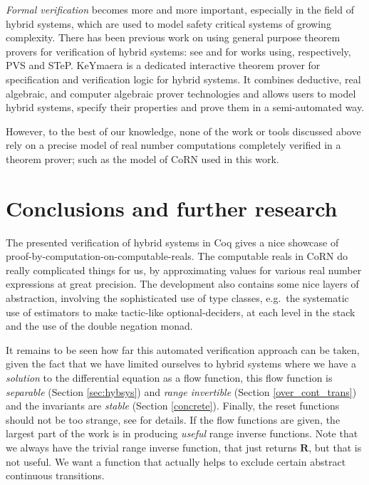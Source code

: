 \documentclass[runningheads]{llncs}
\newcommand{\IR}{{\mathbf R}}
\begin{document}
\emph{Formal verification} becomes more and more important, especially in the
field of hybrid systems, which are used to model safety critical systems 
of growing complexity. There has been previous work on using general purpose 
theorem provers for verification of hybrid systems: see \cite{Mum01,Hen98} 
and \cite{Man98,Man01} for works using, respectively, PVS and STeP. 
KeYmaera \cite{KeYmaera} is a dedicated interactive theorem prover for 
specification and verification logic for hybrid systems. It combines
deductive, real algebraic, and computer algebraic prover technologies
and allows users to model hybrid systems, specify their properties
and prove them in a semi-automated way.

However, to the best of our knowledge, none of the work or tools
discussed above rely on a precise model of real number computations
completely verified in a theorem prover; such as the model of CoRN
used in this work.

\section{Conclusions and further research}
The presented verification of hybrid systems in Coq gives a nice
showcase of proof-by-computation-on-computable-reals. The computable
reals in CoRN do really complicated things for us, by approximating
values for various real number expressions at great precision. The
development also contains some nice layers of abstraction, involving
the sophisticated use of type classes, e.g.\ the systematic use of
estimators to make tactic-like optional-deciders, at each level in the
stack and the use of the double negation monad.

It remains to be seen how far this automated verification approach can
be taken, given the fact that we have limited ourselves to hybrid
systems where we have a {\em solution\/} to the differential equation
as a flow function, this flow function is {\em separable} (Section
\ref{sec:hybsys}) and {\em range invertible} (Section
\ref{over_cont_trans}) and the invariants are {\em stable} (Section
\ref{concrete}). Finally, the reset functions should not be too
strange, see \cite{hybrid-techreport} for details. If the flow
functions are given, the largest part of the work is in producing {\em
  useful\/} range inverse functions. Note that we always have the
trivial range inverse function, that just returns $\IR$, but that is
not useful.  We want a function that actually helps to exclude certain
abstract continuous transitions.
\end{document}
